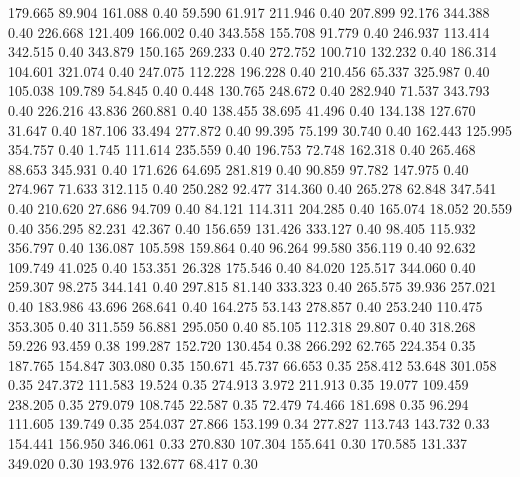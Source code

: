  179.665   89.904  161.088         0.40
  59.590   61.917  211.946         0.40
 207.899   92.176  344.388         0.40
 226.668  121.409  166.002         0.40
 343.558  155.708   91.779         0.40
 246.937  113.414  342.515         0.40
 343.879  150.165  269.233         0.40
 272.752  100.710  132.232         0.40
 186.314  104.601  321.074         0.40
 247.075  112.228  196.228         0.40
 210.456   65.337  325.987         0.40
 105.038  109.789   54.845         0.40
   0.448  130.765  248.672         0.40
 282.940   71.537  343.793         0.40
 226.216   43.836  260.881         0.40
 138.455   38.695   41.496         0.40
 134.138  127.670   31.647         0.40
 187.106   33.494  277.872         0.40
  99.395   75.199   30.740         0.40
 162.443  125.995  354.757         0.40
   1.745  111.614  235.559         0.40
 196.753   72.748  162.318         0.40
 265.468   88.653  345.931         0.40
 171.626   64.695  281.819         0.40
  90.859   97.782  147.975         0.40
 274.967   71.633  312.115         0.40
 250.282   92.477  314.360         0.40
 265.278   62.848  347.541         0.40
 210.620   27.686   94.709         0.40
  84.121  114.311  204.285         0.40
 165.074   18.052   20.559         0.40
 356.295   82.231   42.367         0.40
 156.659  131.426  333.127         0.40
  98.405  115.932  356.797         0.40
 136.087  105.598  159.864         0.40
  96.264   99.580  356.119         0.40
  92.632  109.749   41.025         0.40
 153.351   26.328  175.546         0.40
  84.020  125.517  344.060         0.40
 259.307   98.275  344.141         0.40
 297.815   81.140  333.323         0.40
 265.575   39.936  257.021         0.40
 183.986   43.696  268.641         0.40
 164.275   53.143  278.857         0.40
 253.240  110.475  353.305         0.40
 311.559   56.881  295.050         0.40
  85.105  112.318   29.807         0.40
 318.268   59.226   93.459         0.38
 199.287  152.720  130.454         0.38
 266.292   62.765  224.354         0.35
 187.765  154.847  303.080         0.35
 150.671   45.737   66.653         0.35
 258.412   53.648  301.058         0.35
 247.372  111.583   19.524         0.35
 274.913    3.972  211.913         0.35
  19.077  109.459  238.205         0.35
 279.079  108.745   22.587         0.35
  72.479   74.466  181.698         0.35
  96.294  111.605  139.749         0.35
 254.037   27.866  153.199         0.34
 277.827  113.743  143.732         0.33
 154.441  156.950  346.061         0.33
 270.830  107.304  155.641         0.30
 170.585  131.337  349.020         0.30
 193.976  132.677   68.417         0.30
